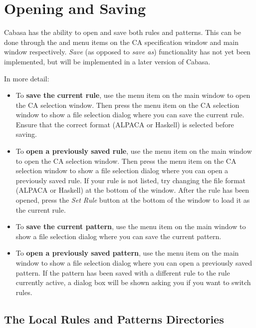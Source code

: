 \documentclass[oneside,a4paper]{memoir}
\begin{document}
\section{Opening and Saving}
\label{sec:opsav}

Cabasa has the ability to open and save both rules and patterns.
This can be done through the  and  menu items on the CA specification window and main window respectively.
\textit{Save} (as opposed to \textit{save as}) functionality has not yet been implemented, but will be implemented in a later version of Cabasa.

In more detail:

\begin{itemize}
\item To \textbf{save the current rule}, use the  menu item on the main window to open the CA selection window.
  Then press the  menu item on the CA selection window to show a file selection dialog where you can save the current rule.
  Ensure that the correct format (ALPACA or Haskell) is selected before saving.
\item To \textbf{open a previously saved rule}, use the  menu item on the main window to open the CA selection window.
  Then press the  menu item on the CA selection window to show a file selection dialog where you can open a previously saved rule.
  If your rule is not listed, try changing the file format (ALPACA or Haskell) at the bottom of the window.
  After the rule has been opened, press the \textit{Set Rule} button at the bottom of the window to load it as the current rule.
\item To \textbf{save the current pattern}, use the  menu item on the main window to show a file selection dialog where you can save the current pattern.
\item To \textbf{open a previously saved pattern}, use the  menu item on the main window to show a file selection dialog where you can open a previously saved pattern.
  If the pattern has been saved with a different rule to the rule currently active,
    a dialog box will be shown asking you if you want to switch rules.
\end{itemize}

\subsection{The Local Rules and Patterns Directories}
\label{sec:locdirs}
\end{document}
